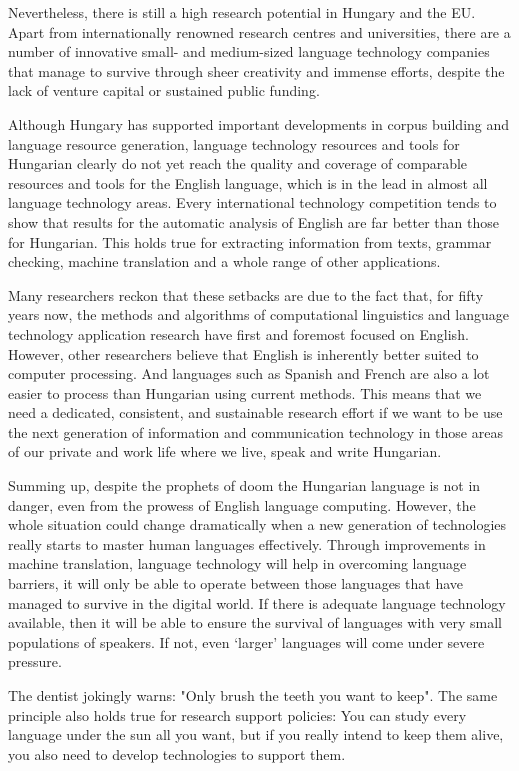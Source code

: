 \begin{multicols}{2}
Nevertheless, there is still a high research potential in Hungary and the EU. Apart from internationally renowned research centres and universities, there are a number of innovative small- and medium-sized language technology companies that manage to survive through sheer creativity and immense efforts, despite the lack of venture capital or sustained public funding.

Although Hungary has supported important developments in corpus building and language resource generation, language technology resources and tools for Hungarian clearly do not yet reach the quality and coverage of comparable resources and tools for the English language, which is in the lead in almost all language technology areas. Every international technology competition tends to show that results for the automatic analysis of English are far better than those for Hungarian. This holds true for extracting information from texts, grammar checking, machine translation and a whole range of other applications.

Many researchers reckon that these setbacks are due to the fact that, for fifty years now, the methods and algorithms of computational linguistics and language technology application research have first and foremost focused on English. However, other researchers believe that English is inherently better suited to computer processing. And languages such as Spanish and French are also a lot easier to process than Hungarian using current methods. This means that we need a dedicated, consistent, and sustainable research effort if we want to be use the next generation of information and communication technology in those areas of our private and work life where we live, speak and write Hungarian.

Summing up, despite the prophets of doom the Hungarian language is not in danger, even from the prowess of English language computing. However, the whole situation could change dramatically when a new generation of technologies really starts to master human languages effectively. Through improvements in machine translation, language technology will help in overcoming language barriers, it will only be able to operate between those languages that have managed to survive in the digital world. If there is adequate language technology available, then it will be able to ensure the survival of languages with very small populations of speakers. If not, even ‘larger’ languages will come under severe pressure.

The dentist jokingly warns: "Only brush the teeth you want to keep".  The same principle also holds true for research support policies: You can study every language under the sun all you want, but if you really 
intend to keep them alive, you also need to develop technologies to support them.
  
\end{multicols}

